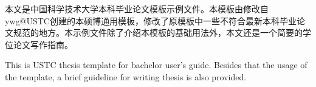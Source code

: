 ﻿\begin{cnabstract}
本文是中国科学技术大学本科毕业论文模板示例文件。本模板由修改自ywg@USTC创建的本硕博通用模板，修改了原模板中一些不符合最新本科毕业论文规范的地方。本示例文件除了介绍本模板的基础用法外，本文还是一个简要的学位论文写作指南。

\end{cnabstract}

\begin{enabstract}
This is USTC thesis template for bachelor  user's guide. Besides that
the usage of the template, a brief
guideline for writing thesis is also provided.

\end{enabstract}
